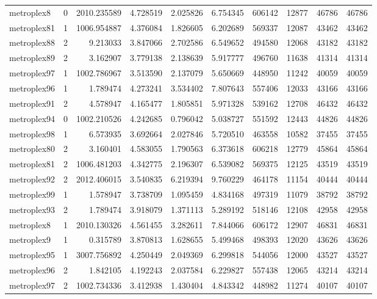 \begin{longtable}{|l|r|r|r|r|r|r|r|r|r|}
metroplex8 & 0 & 2010.235589 & 4.728519 & 2.025826 & 6.754345 & 606142 & 12877 & 46786 & 46786 \\
metroplex81 & 1 & 1006.954887 & 4.376084 & 1.826605 & 6.202689 & 569337 & 12087 & 43462 & 43462 \\
metroplex88 & 2 & 9.213033 & 3.847066 & 2.702586 & 6.549652 & 494580 & 12068 & 43182 & 43182 \\
metroplex89 & 2 & 3.162907 & 3.779138 & 2.138639 & 5.917777 & 496760 & 11638 & 41314 & 41314 \\
metroplex97 & 1 & 1002.786967 & 3.513590 & 2.137079 & 5.650669 & 448950 & 11242 & 40059 & 40059 \\
metroplex96 & 1 & 1.789474 & 4.273241 & 3.534402 & 7.807643 & 557406 & 12033 & 43166 & 43166 \\
metroplex91 & 2 & 4.578947 & 4.165477 & 1.805851 & 5.971328 & 539162 & 12708 & 46432 & 46432 \\
metroplex94 & 0 & 1002.210526 & 4.242685 & 0.796042 & 5.038727 & 551592 & 12443 & 44826 & 44826 \\
metroplex98 & 1 & 6.573935 & 3.692664 & 2.027846 & 5.720510 & 463558 & 10582 & 37455 & 37455 \\
metroplex80 & 2 & 3.160401 & 4.583055 & 1.790563 & 6.373618 & 606218 & 12779 & 45864 & 45864 \\
metroplex81 & 2 & 1006.481203 & 4.342775 & 2.196307 & 6.539082 & 569375 & 12125 & 43519 & 43519 \\
metroplex92 & 2 & 2012.406015 & 3.540835 & 6.219394 & 9.760229 & 464178 & 11154 & 40444 & 40444 \\
metroplex99 & 1 & 1.578947 & 3.738709 & 1.095459 & 4.834168 & 497319 & 11079 & 38792 & 38792 \\
metroplex93 & 2 & 1.789474 & 3.918079 & 1.371113 & 5.289192 & 518146 & 12108 & 42958 & 42958 \\
metroplex8 & 1 & 2010.130326 & 4.561455 & 3.282611 & 7.844066 & 606172 & 12907 & 46831 & 46831 \\
metroplex9 & 1 & 0.315789 & 3.870813 & 1.628655 & 5.499468 & 498393 & 12020 & 43626 & 43626 \\
metroplex95 & 1 & 3007.756892 & 4.250449 & 2.049369 & 6.299818 & 544056 & 12000 & 43527 & 43527 \\
metroplex96 & 2 & 1.842105 & 4.192243 & 2.037584 & 6.229827 & 557438 & 12065 & 43214 & 43214 \\
metroplex97 & 2 & 1002.734336 & 3.412938 & 1.430404 & 4.843342 & 448982 & 11274 & 40107 & 40107 \\

\end{longtable}
